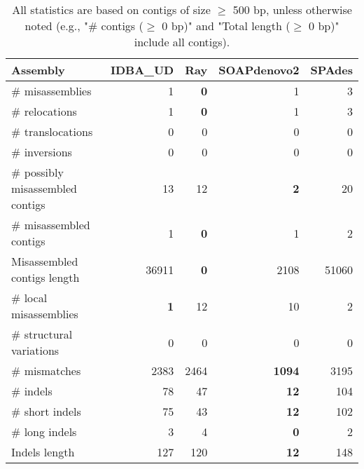 \documentclass[12pt,a4paper]{article}
\begin{document}
\begin{table}[ht]
\begin{center}
\caption{All statistics are based on contigs of size $\geq$ 500 bp, unless otherwise noted (e.g., "\# contigs ($\geq$ 0 bp)" and "Total length ($\geq$ 0 bp)" include all contigs).}
\begin{tabular}{|l*{4}{|r}|}
\hline
Assembly & IDBA\_UD & Ray & SOAPdenovo2 & SPAdes \\ \hline
\# misassemblies & 1 & {\bf 0} & 1 & 3 \\ \hline
\hspace{5mm}\# relocations & 1 & {\bf 0} & 1 & 3 \\ \hline
\hspace{5mm}\# translocations & 0 & 0 & 0 & 0 \\ \hline
\hspace{5mm}\# inversions & 0 & 0 & 0 & 0 \\ \hline
\# possibly misassembled contigs & 13 & 12 & {\bf 2} & 20 \\ \hline
\# misassembled contigs & 1 & {\bf 0} & 1 & 2 \\ \hline
Misassembled contigs length & 36911 & {\bf 0} & 2108 & 51060 \\ \hline
\# local misassemblies & {\bf 1} & 12 & 10 & 2 \\ \hline
\# structural variations & 0 & 0 & 0 & 0 \\ \hline
\# mismatches & 2383 & 2464 & {\bf 1094} & 3195 \\ \hline
\# indels & 78 & 47 & {\bf 12} & 104 \\ \hline
\hspace{5mm}\# short indels & 75 & 43 & {\bf 12} & 102 \\ \hline
\hspace{5mm}\# long indels & 3 & 4 & {\bf 0} & 2 \\ \hline
Indels length & 127 & 120 & {\bf 12} & 148 \\ \hline
\end{tabular}
\end{center}
\end{table}
\end{document}
